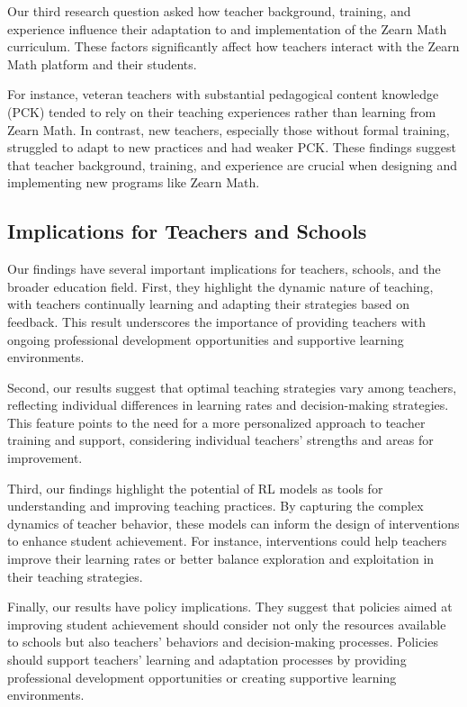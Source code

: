 \documentclass[
  number,
  preprint,
  3p,
  onecolumn]{elsarticle}
\begin{document}
Our third research question asked how teacher background, training, and
experience influence their adaptation to and implementation of the Zearn
Math curriculum. These factors significantly affect how teachers
interact with the Zearn Math platform and their students.

For instance, veteran teachers with substantial pedagogical content
knowledge (PCK) tended to rely on their teaching experiences rather than
learning from Zearn Math. In contrast, new teachers, especially those
without formal training, struggled to adapt to new practices and had
weaker PCK. These findings suggest that teacher background, training,
and experience are crucial when designing and implementing new programs
like Zearn Math.

\hypertarget{implications-for-teachers-and-schools}{%
\subsection{Implications for Teachers and
Schools}\label{implications-for-teachers-and-schools}}

Our findings have several important implications for teachers, schools,
and the broader education field. First, they highlight the dynamic
nature of teaching, with teachers continually learning and adapting
their strategies based on feedback. This result underscores the
importance of providing teachers with ongoing professional development
opportunities and supportive learning environments.

Second, our results suggest that optimal teaching strategies vary among
teachers, reflecting individual differences in learning rates and
decision-making strategies. This feature points to the need for a more
personalized approach to teacher training and support, considering
individual teachers' strengths and areas for improvement.

Third, our findings highlight the potential of RL models as tools for
understanding and improving teaching practices. By capturing the complex
dynamics of teacher behavior, these models can inform the design of
interventions to enhance student achievement. For instance,
interventions could help teachers improve their learning rates or better
balance exploration and exploitation in their teaching strategies.

Finally, our results have policy implications. They suggest that
policies aimed at improving student achievement should consider not only
the resources available to schools but also teachers' behaviors and
decision-making processes. Policies should support teachers' learning
and adaptation processes by providing professional development
opportunities or creating supportive learning environments.
\end{document}
